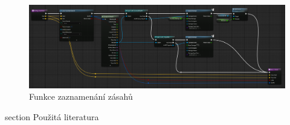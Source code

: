 \documentclass[12pt,a4paper,hidelinks]{article}
\begin{document}
\begin{landscape}
\begin{figure}[h!]
\centering
\includegraphics[width=1.0\linewidth]{images/hitreg.png}
\caption{Funkce zaznamenání zásahů}
\end{figure}
\clearpage
\end{landscape}


\printbibliography
{} {section} {Použitá literatura}
\end{document}
